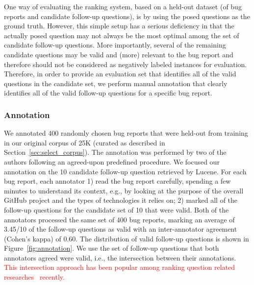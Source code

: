 One way of evaluating the ranking system, based on a held-out dataset (of bug reports and candidate follow-up questions), is
by using the posed questions as the ground truth. However, this simple setup has a serious deficiency in that the actually posed question
may not always be the most optimal among the set of candidate follow-up questions. More importantly, several of
the remaining candidate questions may be valid and (more) relevant to the bug report and therefore should
not be considered as negatively labeled instances for evaluation. Therefore, in order to provide an evaluation
set that identifies all of the valid questions in the candidate set, we perform manual annotation that clearly
identifies all of the valid follow-up questions for a specific bug report.



\subsubsection{Annotation}
We annotated 400 randomly chosen bug reports that were held-out from training in our original corpus of 25K (curated as described in Section~\ref{sec:select_corpus}). The annotation
was performed by two of the authors following an agreed-upon predefined procedure. We focused our annotation on the 10 candidate follow-up question retrieved by Lucene. For each bug report, each annotator 1)
read the bug report carefully, spending a few minutes to understand its context, e.g., by looking at the purpose of the overall GitHub
project and the types of technologies it relies on; 2) marked all of the follow-up questions for the candidate set of 10
that were valid. Both of the annotators processed the same set of 400 bug reports, marking an average of 3.45/10 of the follow-up questions as valid with an inter-annotator agreement (Cohen's kappa) of 0.60. The distribution of valid follow-up questions is shown in Figure~\ref{fig:annotation}.
We use the set of follow-up questions that both annotators agreed were valid, i.e., the intersection between their annotations. \textcolor{red}{This intersection approach has been popular among ranking question related researches~\cite{rao-daume-iii-2018-learning, kumar2020ranking} recently.}



